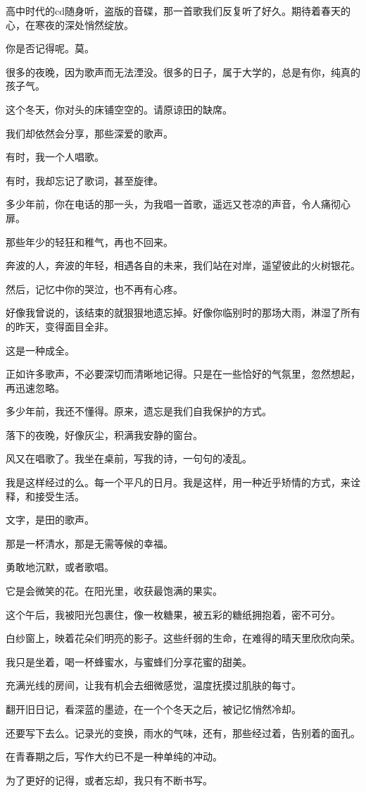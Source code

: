 \documentclass[12pt,a4paper]{article}
\begin{document}
		高中时代的cd随身听，盗版的音碟，那一首歌我们反复听了好久。期待着春天的心，在寒夜的深处悄然绽放。\par
		你是否记得呢。莫。\par
		很多的夜晚，因为歌声而无法湮没。很多的日子，属于大学的，总是有你，纯真的孩子气。\par
		这个冬天，你对头的床铺空空的。请原谅田的缺席。\par
		我们却依然会分享，那些深爱的歌声。

		有时，我一个人唱歌。\par
		有时，我却忘记了歌词，甚至旋律。

		多少年前，你在电话的那一头，为我唱一首歌，遥远又苍凉的声音，令人痛彻心扉。\par
		那些年少的轻狂和稚气，再也不回来。\par
		奔波的人，奔波的年轻，相遇各自的未来，我们站在对岸，遥望彼此的火树银花。\par
		然后，记忆中你的哭泣，也不再有心疼。\par
		好像我曾说的，该结束的就狠狠地遗忘掉。好像你临别时的那场大雨，淋湿了所有的昨天，变得面目全非。\par
		这是一种成全。\par
		正如许多歌声，不必要深切而清晰地记得。只是在一些恰好的气氛里，忽然想起，再迅速忽略。\par
		多少年前，我还不懂得。原来，遗忘是我们自我保护的方式。


		落下的夜晚，好像灰尘，积满我安静的窗台。\par
		风又在唱歌了。我坐在桌前，写我的诗，一句句的凌乱。\par
		我是这样经过的么。每一个平凡的日月。我是这样，用一种近乎矫情的方式，来诠释，和接受生活。\par
		文字，是田的歌声。

		那是一杯清水，那是无需等候的幸福。\par
		勇敢地沉默，或者歌唱。

	\endwriting



		它是会微笑的花。在阳光里，收获最饱满的果实。


		这个午后，我被阳光包裹住，像一枚糖果，被五彩的糖纸拥抱着，密不可分。\par
		白纱窗上，映着花朵们明亮的影子。这些纤弱的生命，在难得的晴天里欣欣向荣。\par
		我只是坐着，喝一杯蜂蜜水，与蜜蜂们分享花蜜的甜美。\par
		充满光线的房间，让我有机会去细微感觉，温度抚摸过肌肤的每寸。\par
		翻开旧日记，看深蓝的墨迹，在一个个冬天之后，被记忆悄然冷却。\par
		还要写下去么。记录光的变换，雨水的气味，还有，那些经过着，告别着的面孔。\par
		在青春期之后，写作大约已不是一种单纯的冲动。\par
		为了更好的记得，或者忘却，我只有不断书写。
\end{document}
